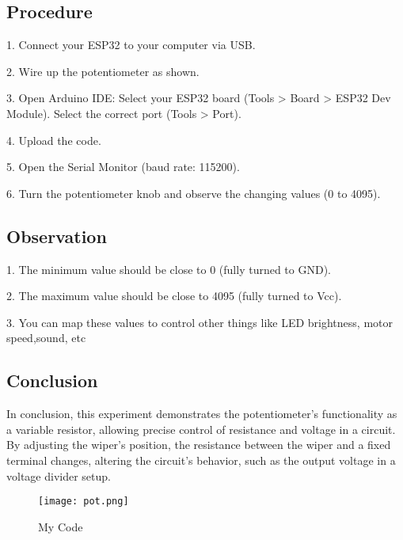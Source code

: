 \documentclass{article}
\begin{document}
\subsection{Procedure}

\item 1. Connect your ESP32 to your computer via USB.
\item 2. Wire up the potentiometer as shown.
\item 3. Open Arduino IDE:
 Select your ESP32 board (Tools > Board > ESP32 Dev Module).
 Select the correct port (Tools > Port).
\item 4. Upload the code.

\item 5. Open the Serial Monitor (baud rate: 115200).
\item 6. Turn the potentiometer knob and observe the changing values (0 to 4095).


\subsection{Observation}
\item  1. The minimum value should be close to 0 (fully turned to GND).

\item  2. The maximum value should be close to 4095 (fully turned to Vcc).
\item  3. You can map these values to control other things like LED brightness, motor speed,sound, etc

\subsection{Conclusion}

In conclusion, this experiment demonstrates the potentiometer’s functionality as a variable resistor, allowing precise control of resistance and voltage in a circuit. By adjusting the wiper’s position, the resistance between the wiper and a fixed terminal changes, altering the circuit’s behavior, such as the output voltage in a voltage divider setup.

\begin{figure}[h]
    \centering
    \texttt{[image: pot.png]}
    \caption{My Code}
    \label{fig:image}
\end{figure}
\end{document}
